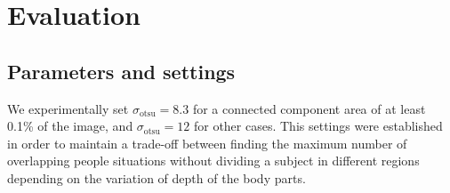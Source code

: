 \documentclass[10pt,twocolumn,letterpaper]{article}
\begin{document}
%
%
%


\section{Evaluation}
\label{sec:evaluation}

\subsection{Parameters and settings}
\label{ssec:parametersandsettings}

We experimentally set $\sigma_\text{otsu} = 8.3$ for a connected component area of at least 0.1\% of the image, and  $\sigma_\text{otsu} = 12$ for other cases. This settings were established in order to maintain a trade-off between finding the maximum number of overlapping people situations without dividing a subject in different regions depending on the variation of depth of the body parts.
\end{document}
